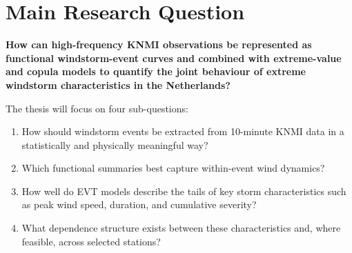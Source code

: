 \section*{Main Research Question}
\textbf{How can high-frequency KNMI observations be represented as functional windstorm-event curves and combined with extreme-value and copula models to quantify the joint behaviour of extreme windstorm characteristics in the Netherlands?}

The thesis will focus on four sub-questions:
\begin{enumerate}
    \item How should windstorm events be extracted from 10-minute KNMI data in a statistically and physically meaningful way?
    \item Which functional summaries best capture within-event wind dynamics?
    \item How well do EVT models describe the tails of key storm characteristics such as peak wind speed, duration, and cumulative severity?
    \item What dependence structure exists between these characteristics and, where feasible, across selected stations?
\end{enumerate}

